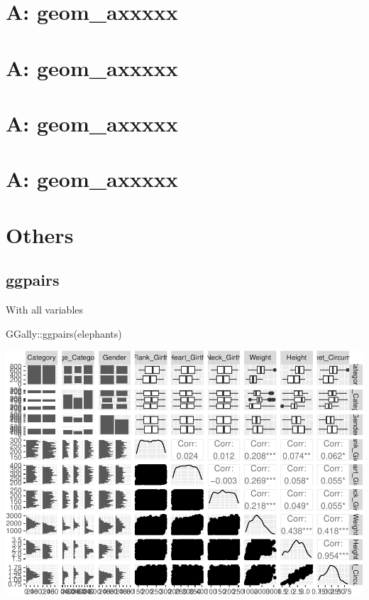 \documentclass[
]{book}
\newenvironment{Shaded}{\begin{snugshade}}{\end{snugshade}}
\newcommand{\FunctionTok}[1]{\textcolor[rgb]{0.00,0.00,0.00}{#1}}
\newcommand{\NormalTok}[1]{#1}
\newcommand{\SpecialCharTok}[1]{\textcolor[rgb]{0.00,0.00,0.00}{#1}}
\begin{document}
\hypertarget{a-geom_axxxxx-10}{%
\chapter{A: geom\_axxxxx}\label{a-geom_axxxxx-10}}

\hypertarget{a-geom_axxxxx-11}{%
\chapter{A: geom\_axxxxx}\label{a-geom_axxxxx-11}}

\hypertarget{a-geom_axxxxx-12}{%
\chapter{A: geom\_axxxxx}\label{a-geom_axxxxx-12}}

\hypertarget{a-geom_axxxxx-13}{%
\chapter{A: geom\_axxxxx}\label{a-geom_axxxxx-13}}

\hypertarget{others}{%
\chapter{Others}\label{others}}

\hypertarget{ggpairs}{%
\section{ggpairs}\label{ggpairs}}

With all variables

\begin{Shaded}
\begin{Highlighting}[]
\NormalTok{GGally}\SpecialCharTok{::}\FunctionTok{ggpairs}\NormalTok{(elephants)}
\end{Highlighting}
\end{Shaded}

\includegraphics{Data-Visualisation-geom-Encyclopedia_files/figure-latex/unnamed-chunk-54-1.pdf}
\end{document}

